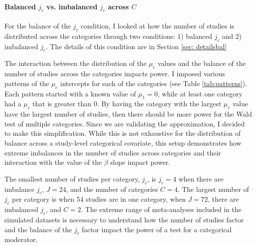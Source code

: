 \paragraph{Balanced $j_c$ vs. imbalanced $j_c$ across $C$} 

For the balance of the $j_c$ condition, I looked at how the number of studies is distributed across the categories through two conditions: 1) balanced $j_c$ and 2) imbalanced $j_c$. The details of this condition are in Section \ref{sec: detailsbal}

The interaction between the distribution of the $\mu_c$ values and the balance of the number of studies across the categories impacts power. I imposed various patterns of the $\mu_c$ intercepts for each of the categories (see Table \ref{tab:patterns}). Each pattern started with a known value of $\mu_1 = 0$, while at least one category had a $\mu_c$ that is greater than 0. By having the category with the largest $\mu_c$ value have the largest number of studies, then there should be more power for the Wald test of multiple categories. Since we are validating the approximation, I decided to make this simplification. While this is not exhaustive for the distribution of balance across a study-level categorical covariate, this setup demonstrates how extreme imbalances in the number of studies across categories and their interaction with the value of the $\beta$ slope impact power. 

The smallest number of studies per category, $j_c$, is $j_c = 4$ when there are imbalance $j_c$, $J = 24$, and the number of categories $C = 4$. The largest number of $j_c$ per category is when 54 studies are in one category, when $J= 72$, there are imbalanced $j_c$, and $C=2$. The extreme range of meta-analyses included in the simulated datasets is necessary to understand how the number of studies factor and the balance of the $j_c$ factor impact the power of a test for a categorical moderator. 



